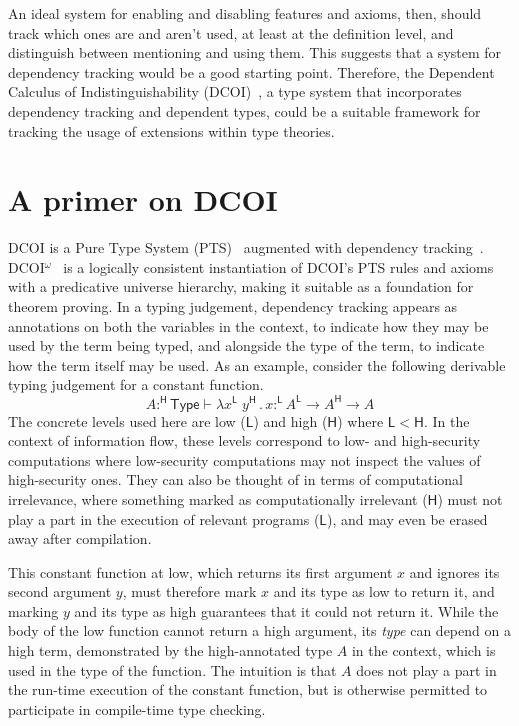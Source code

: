 \documentclass{article}
\newcommand{\kw}[1]{\mathsf{#1}}
\newcommand{\HH}{\mathsf{H}}
\newcommand{\LL}{\mathsf{L}}
\begin{document}
An ideal system for enabling and disabling features and axioms, then,
should track which ones are and aren't used, at least at the definition level,
and distinguish between mentioning and using them.
This suggests that a system for dependency tracking would be a good starting point.
Therefore, the Dependent Calculus of Indistinguishability (DCOI)~\citep{dcoi},
a type system that incorporates dependency tracking and dependent types,
could be a suitable framework for tracking the usage of extensions within type theories.

\section{A primer on DCOI} \label{sec:dcoi}

DCOI is a Pure Type System (PTS)~\citep{pts} augmented with dependency tracking~\cite{dcc}.
DCOI$^\omega$~\citep{dcoi-omega} is a logically consistent instantiation
of DCOI's PTS rules and axioms with a predicative universe hierarchy,
making it suitable as a foundation for theorem proving.
In a typing judgement, dependency tracking appears as annotations
on both the variables in the context,
to indicate how they may be used by the term being typed,
and alongside the type of the term,
to indicate how the term itself may be used.
As an example, consider the following derivable typing judgement for a constant function.
$$A :^\HH \kw{Type} \vdash \lambda x^\LL \; y^\HH \mathpunct{.} x :^\LL
  A^\LL \to A^\HH \to A$$
The concrete levels used here are low ($\LL$) and high ($\HH$) where $\LL < \HH$.
In the context of information flow,
these levels correspond to low- and high-security computations
where low-security computations may not inspect the values of high-security ones.
They can also be thought of in terms of computational irrelevance,
where something marked as computationally irrelevant ($\HH$)
must not play a part in the execution of relevant programs ($\LL$),
and may even be erased away after compilation.

This constant function at low,
which returns its first argument $x$ and ignores its second argument $y$,
must therefore mark $x$ and its type as low to return it,
and marking $y$ and its type as high guarantees that it could not return it.
While the body of the low function cannot return a high argument,
its \emph{type} can depend on a high term,
demonstrated by the high-annotated type $A$ in the context,
which is used in the type of the function.
The intuition is that $A$ does not play a part in the run-time execution of the constant function,
but is otherwise permitted to participate in compile-time type checking.
\end{document}
